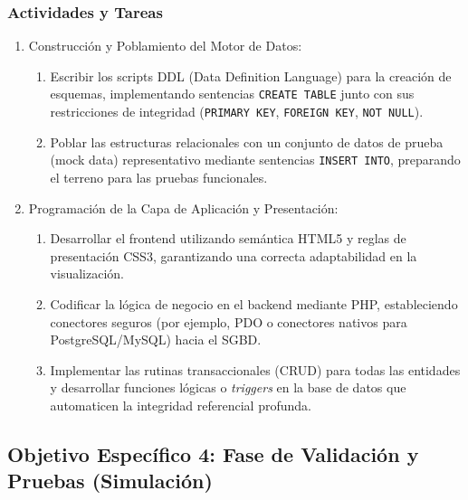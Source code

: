\subsubsection{Actividades y Tareas}
\begin{enumerate}
	\item Construcción y Poblamiento del Motor de Datos:
	\begin{enumerate}
		\item Escribir los scripts DDL (Data Definition Language) para la creación de esquemas, implementando sentencias \texttt{CREATE TABLE} junto con sus restricciones de integridad (\texttt{PRIMARY KEY}, \texttt{FOREIGN KEY}, \texttt{NOT NULL}).
		\item Poblar las estructuras relacionales con un conjunto de datos de prueba (mock data) representativo mediante sentencias \texttt{INSERT INTO}, preparando el terreno para las pruebas funcionales.
	\end{enumerate}
	\item Programación de la Capa de Aplicación y Presentación:
	\begin{enumerate}
		\item Desarrollar el frontend utilizando semántica HTML5 y reglas de presentación CSS3, garantizando una correcta adaptabilidad en la visualización.
		\item Codificar la lógica de negocio en el backend mediante PHP, estableciendo conectores seguros (por ejemplo, PDO o conectores nativos para PostgreSQL/MySQL) hacia el SGBD.
		\item Implementar las rutinas transaccionales (CRUD) para todas las entidades y desarrollar funciones lógicas o \textit{triggers} en la base de datos que automaticen la integridad referencial profunda.
	\end{enumerate}
\end{enumerate}

\subsection{Objetivo Específico 4: Fase de Validación y Pruebas (Simulación)}
